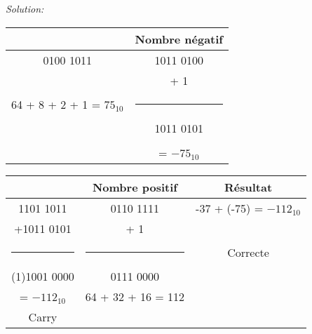 \documentclass{article}
\newenvironment{solution}
    {\textit{Solution:}}
    {}
\begin{document}
\begin{solution}
\begin{itemize}
        \begin{tabular}{|c|c|}
        \hline
        & Nombre négatif\\
        \hline    
        0100 1011                   &       1011 0100           \\
                                    &       + \hspace{25pt} 1   \\
        64 + 8 + 2 + 1 = $75_{10}$  &       \rule{1in}{1pt}     \\
        \hspace{5pt}                &       1011 0101           \\
        \hspace{100pt}              &       \hspace{100pt}      \\
                                    &       = $-75_{10}$        \\
        \hline
        \end{tabular}
        
        \hspace{40pt}
        
        \begin{tabular}{|c|c|c|}
        \hline
        & Nombre positif & Résultat \\
        \hline
        \hspace{6pt}1101 1011       &       0110 1111                   &       -37 + (-75) = $-112_{10}$         \\
        +1011 0101                  &       + \hspace{25pt} 1           &                                         \\
        \rule{1in}{1pt}             &       \rule{1in}{1pt}             &       Correcte                          \\
        (1)1001 0000                &       0111 0000                   &                                         \\
        \hspace{33pt} = $-112_{10}$ \hspace{20pt}  &       64 + 32 + 16 = 112   &                                   \\
        Carry                       &       \hspace{100pt}              &      \hspace{100pt}                     \\
        \hline
        \end{tabular}
        

\end{itemize}
\end{solution}
\end{document}
